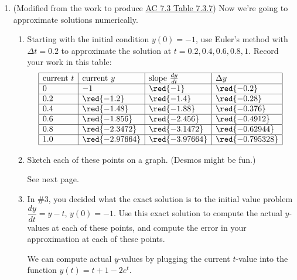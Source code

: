 \begin{enumerate}[leftmargin=0pt]
\item (Modified from the work to produce \href{https://activecalculus.org/single/sec-7-3-euler.html#OcJ}{AC 7.3 Table 7.3.7}) Now we're going to approximate solutions numerically.
\begin{enumerate}
    \item Starting with the initial condition $y(0) = -1$, use Euler's method with $\Delta t = 0.2$ to approximate the solution at $t=0.2, 0.4, 0.6, 0.8, 1$. Record your work in this table:
    \[
    \begin{array}{|l|l|l|l|} 
    \hline
    \textrm{current } t & \textrm{current } y & \textrm{slope } \frac{dy}{dt} & \Delta y        \\\hline
    0                   & -1                  & \red{-1}                      & \red{-0.2}      \\\hline
    0.2                 & \red{-1.2}          & \red{-1.4}                    & \red{-0.28}     \\\hline
    0.4                 & \red{-1.48}         & \red{-1.88}                   & \red{-0.376}    \\\hline
    0.6                 & \red{-1.856}        & \red{-2.456}                  & \red{-0.4912}   \\\hline
    0.8                 & \red{-2.3472}       & \red{-3.1472}                 & \red{-0.62944}  \\\hline
    1.0                 & \red{-2.97664}      & \red{-3.97664}                & \red{-0.795328} \\\hline
    \end{array}
    \]
    
    \item Sketch each of these points on a graph. (Desmos might be fun.)

    \begin{red}
        See next page.
    \end{red}
    \item In \#3, you decided what the exact solution is to the initial value problem $\dfrac{dy}{dt} = y-t$, $y(0) = -1$. Use this exact solution to compute the actual $y$-values at each of these points, and compute the error in your approximation at each of these points.
    
    \begin{red}
    We can compute actual $y$-values by plugging the current $t$-value into the function $y(t) = t+1-2e^t$.
    

\end{red}
\end{enumerate}
\end{enumerate}
